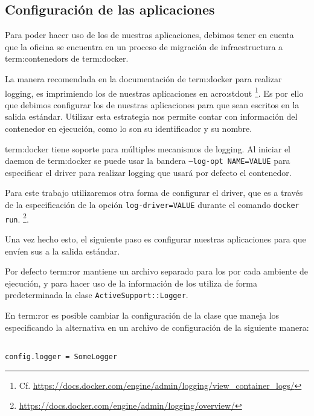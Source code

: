 \subsection{Configuración de las aplicaciones}
\label{configuracion_de_las_aplicaciones}

Para poder hacer uso de los  de nuestras aplicaciones, debimos tener en
cuenta que la oficina se encuentra en un proceso de migración de
infraestructura a \glspl{term:contenedor} de \gls{term:docker}.

La manera recomendada en la documentación de \gls{term:docker} para realizar
logging, es imprimiendo los  de nuestras aplicaciones en \gls{acro:stdout}
\footnote{Cf. \url{https://docs.docker.com/engine/admin/logging/view_container_logs/}}.
Es por ello que debimos configurar los  de nuestras aplicaciones para que sean
escritos en la salida estándar. Utilizar esta estrategia nos permite contar
con información del contenedor en ejecución, como lo son su identificador y su
nombre.

\gls{term:docker} tiene soporte para múltiples mecanismos de logging. Al
iniciar el daemon de \gls{term:docker} se puede usar la bandera
\texttt{--log-opt NAME=VALUE} para especificar el driver para realizar logging
que usará por defecto el contenedor.

Para este trabajo utilizaremos otra forma de configurar el driver, que es a
través de la especificación de la opción \texttt{log-driver=VALUE} durante el
comando \lstinline{docker run}.
\footnote{\url{https://docs.docker.com/engine/admin/logging/overview/}}.

Una vez hecho esto, el siguiente paso es configurar nuestras aplicaciones para
que envíen sus  a la salida estándar.

Por defecto \gls{term:ror} mantiene un archivo separado para los  por cada
ambiente de ejecución, y para hacer uso de la información de los  utiliza
de forma predeterminada la clase \texttt{ActiveSupport::Logger}.

En \gls{term:ror} es posible cambiar la configuración de la clase que maneja los
 especificando la alternativa en un archivo de configuración de la siguiente manera:

\begin{lstlisting}

config.logger = SomeLogger

\end{lstlisting}

